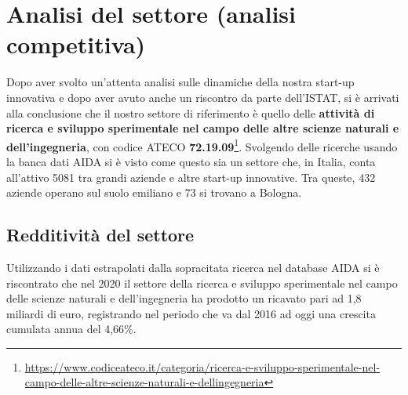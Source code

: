 

\renewcommand\tabularxcolumn[1]{m{#1}}

\section{Analisi del settore (analisi competitiva)}

Dopo aver svolto un'attenta analisi sulle dinamiche della nostra start-up innovativa e dopo aver avuto anche un riscontro da parte dell'ISTAT, si è arrivati alla conclusione che il nostro settore di riferimento è quello delle \textbf{attività di ricerca e sviluppo sperimentale nel campo delle altre scienze naturali e dell'ingegneria}, con codice ATECO \textbf{72.19.09}\footnote{\url{https://www.codiceateco.it/categoria/ricerca-e-sviluppo-sperimentale-nel-campo-delle-altre-scienze-naturali-e-dellingegneria}}. Svolgendo delle ricerche usando la banca dati AIDA si è visto come questo sia un settore che, in Italia, conta all'attivo 5081 tra grandi aziende e altre start-up innovative. Tra queste, 432 aziende operano sul suolo emiliano e 73 si trovano a Bologna.

\subsection{Redditività del settore}

Utilizzando i dati estrapolati dalla sopracitata ricerca nel database AIDA si è riscontrato che nel 2020 il settore della ricerca e sviluppo sperimentale nel campo delle scienze naturali e dell'ingegneria ha prodotto un ricavato pari ad 1,8 miliardi di euro, registrando nel periodo che va dal 2016 ad oggi una crescita cumulata annua del 4,66\%.

